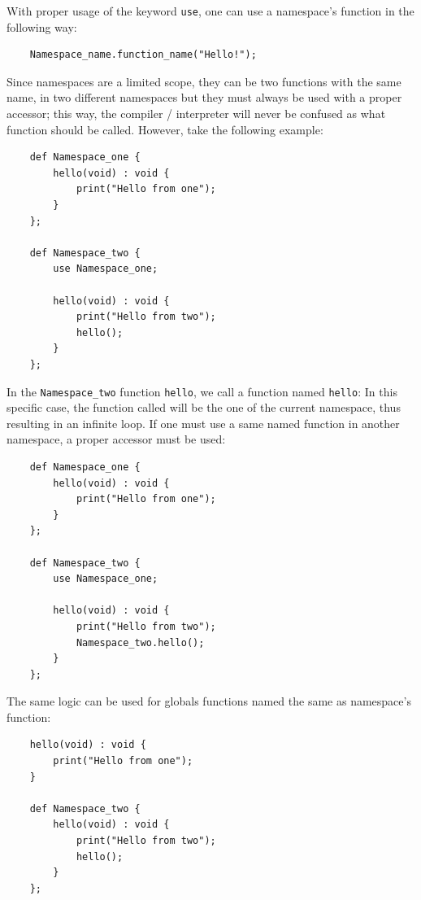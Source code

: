 \documentclass{scrartcl}
\begin{document}
            With proper usage of the keyword \texttt{use}, one can use a
            namespace's function in the following way:
            \begin{lstlisting}
    Namespace_name.function_name("Hello!");
            \end{lstlisting}

            Since namespaces are a limited scope, they can be two functions with
            the same name, in two different namespaces but they must always be used
            with a proper accessor; this way, the compiler / interpreter will
            never be confused as what function should be called.
            However, take the following example:

            \begin{lstlisting}
    def Namespace_one {
        hello(void) : void {
            print("Hello from one");
        }
    };

    def Namespace_two {
        use Namespace_one;

        hello(void) : void {
            print("Hello from two");
            hello();
        }
    };
            \end{lstlisting}
            In the \texttt{Namespace\_two} function \texttt{hello}, we call a
            function named \texttt{hello}: In this specific case, the function
            called will be the one of the current namespace, thus resulting in
            an infinite loop. If one must use a same named function in another
            namespace, a proper accessor must be used:
            \begin{lstlisting}
    def Namespace_one {
        hello(void) : void {
            print("Hello from one");
        }
    };

    def Namespace_two {
        use Namespace_one;

        hello(void) : void {
            print("Hello from two");
            Namespace_two.hello();
        }
    };

            \end{lstlisting}
            The same logic can be used for globals functions named the same as
            namespace's function:
            \begin{lstlisting}
    hello(void) : void {
        print("Hello from one");
    }

    def Namespace_two {
        hello(void) : void {
            print("Hello from two");
            hello();
        }
    };
            \end{lstlisting}
\end{document}
